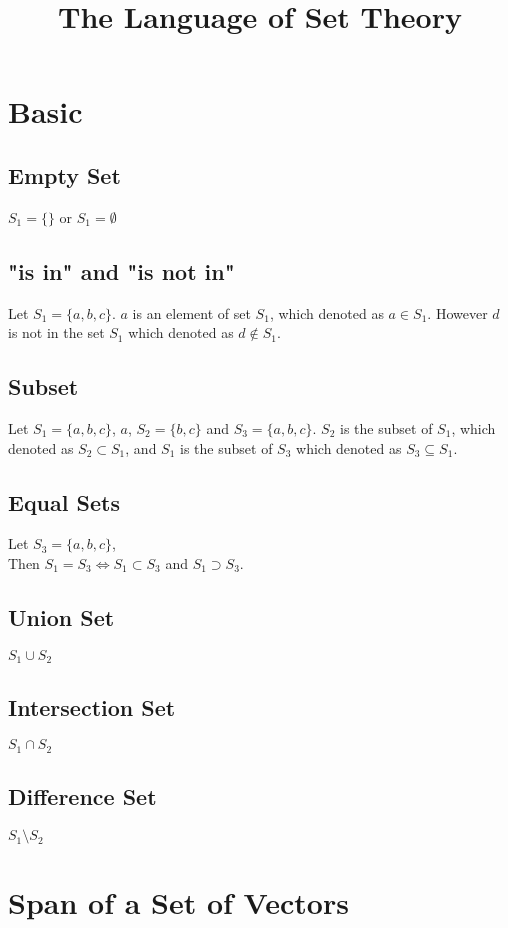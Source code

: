 \documentclass[12pt]{article}
\begin{document}
\title{The Language of Set Theory}
\maketitle
\section{Basic}
\subsection{Empty Set}
$S_1=\lbrace\rbrace$ or $S_1=\emptyset$
\subsection{"is in" and "is not in"}
Let $S_1=\lbrace a,b,c\rbrace$. $a$ is an element of set $S_1$, which denoted as $a \in S_1$. However $d$ is not in the set $S_1$ which denoted as $d \notin S_1$.
\subsection{Subset}
Let $S_1=\lbrace a,b,c\rbrace$, $a$, $S_2=\lbrace b,c\rbrace$ and $S_3=\lbrace a,b,c\rbrace$. $S_2$ is the subset of $S_1$, which denoted as $S_2 \subset S_1$, and $S_1$ is the subset of $S_3$ which denoted as $S_3 \subseteq S_1$.
\subsection{Equal Sets}
Let $S_3=\lbrace a,b,c\rbrace$,\\
Then $S_1=S_3 \Leftrightarrow S_1 \subset S_3$ and $S_1 \supset S_3$. 
\subsection{Union Set}
$S_1 \cup S_2$
\subsection{Intersection Set}
$S_1 \cap S_2$
\subsection{Difference Set}
$S_1\setminus S_2$

\section{Span of a Set of Vectors}
\end{document}
